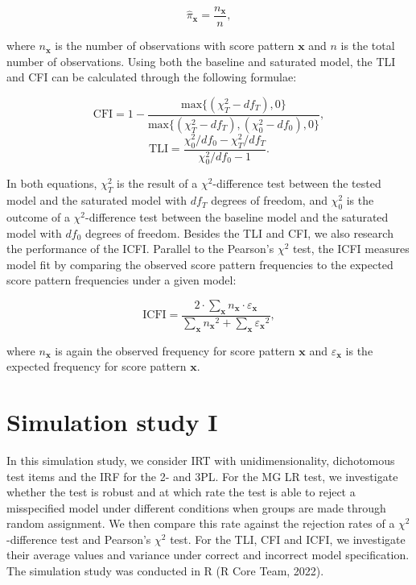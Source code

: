 \documentclass[Royal,sageapa,times,doublespace]{sagej}
\begin{document}
\begin{equation*}
\hat{\pi}_{\boldsymbol{x}} = \frac{n_{\boldsymbol{x}}}{n},
\end{equation*}

where $n_{\boldsymbol{x}}$ is the number of observations with score pattern $\boldsymbol{x}$ and $n$ is the total number of observations. Using both the baseline and saturated model, the TLI and CFI can be calculated through the following formulae:

\begin{equation}
\text{CFI} = 1 - \frac{\text{max}\{(\chi^2_T - df_T), 0\}}{\text{max}\{(\chi^2_T - df_T), (\chi^2_0 - df_0), 0\}},
\end{equation}
\begin{equation}
\text{TLI} = \frac{\chi^2_0/df_0 - \chi^2_T/df_T}{\chi^2_0/df_0 - 1}.
\end{equation}

In both equations, $\chi^{2}_{T}$ is the result of a $\chi^2$-difference test between the tested model and the saturated model with $df_T$ degrees of freedom, and $\chi^{2}_{0}$ is the outcome of a $\chi^2$-difference test between the baseline model and the saturated model with $df_0$ degrees of freedom. Besides the TLI and CFI, we also research the performance of the ICFI. Parallel to the Pearson's $\chi^2$ test, the ICFI measures model fit by comparing the observed score pattern frequencies to the expected score pattern frequencies under a given model:

\begin{equation}
\text{ICFI} = \frac{2 \cdot \sum_{\boldsymbol{x}}  n_{\boldsymbol{x}} \cdot \varepsilon_{\boldsymbol{x}}  }{  \sum_{\boldsymbol{x}}  {n_{\boldsymbol{x}}}^2 +  \sum_{\boldsymbol{x}}  {\varepsilon_{\boldsymbol{x}}} ^2 },
\end{equation}

where $n_{\boldsymbol{x}}$ is again the observed frequency for score pattern $\boldsymbol{x}$ and $\varepsilon_{\boldsymbol{x}}$ is the expected frequency for score pattern $\boldsymbol{x}$. 

\section{Simulation study I}

In this simulation study, we consider IRT with unidimensionality, dichotomous test items and the IRF for the 2- and 3PL. For the MG LR test, we investigate whether the test is robust and at which rate the test is able to reject a misspecified model under different conditions when groups are made through random assignment. We then compare this rate against the rejection rates of a $\chi^2$-difference test and Pearson's $\chi^2$ test. For the TLI, CFI and ICFI, we investigate their average values and variance under correct and incorrect model specification. The simulation study was conducted in R (R Core Team, 2022).
\end{document}
